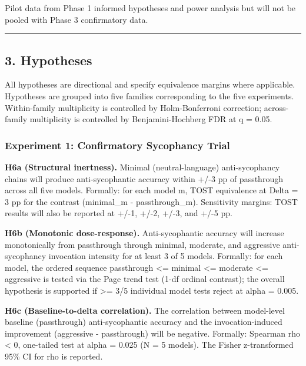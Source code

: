 \documentclass[
  11pt,
]{article}
\begin{document}
Pilot data from Phase 1 informed hypotheses and power analysis but will
not be pooled with Phase 3 confirmatory data.

\begin{center}\rule{0.5\linewidth}{0.5pt}\end{center}

\subsection{3. Hypotheses}\label{hypotheses}

All hypotheses are directional and specify equivalence margins where
applicable. Hypotheses are grouped into five families corresponding to
the five experiments. Within-family multiplicity is controlled by
Holm-Bonferroni correction; across-family multiplicity is controlled by
Benjamini-Hochberg FDR at q = 0.05.

\subsubsection{Experiment 1: Confirmatory Sycophancy
Trial}\label{experiment-1-confirmatory-sycophancy-trial}

\textbf{H6a (Structural inertness).} Minimal (neutral-language)
anti-sycophancy chains will produce anti-sycophantic accuracy within
+/-3 pp of passthrough across all five models. Formally: for each model
m, TOST equivalence at Delta = 3 pp for the contrast (minimal\_m -
passthrough\_m). Sensitivity margins: TOST results will also be reported
at +/-1, +/-2, +/-3, and +/-5 pp.

\textbf{H6b (Monotonic dose-response).} Anti-sycophantic accuracy will
increase monotonically from passthrough through minimal, moderate, and
aggressive anti-sycophancy invocation intensity for at least 3 of 5
models. Formally: for each model, the ordered sequence passthrough
\textless= minimal \textless= moderate \textless= aggressive is tested
via the Page trend test (1-df ordinal contrast); the overall hypothesis
is supported if \textgreater= 3/5 individual model tests reject at alpha
= 0.005.

\textbf{H6c (Baseline-to-delta correlation).} The correlation between
model-level baseline (passthrough) anti-sycophantic accuracy and the
invocation-induced improvement (aggressive - passthrough) will be
negative. Formally: Spearman rho \textless{} 0, one-tailed test at alpha
= 0.025 (N = 5 models). The Fisher z-transformed 95\% CI for rho is
reported.
\end{document}
